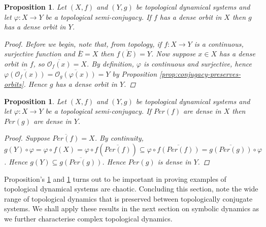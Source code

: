 \documentclass[11pt,a4paper,oneside]{memoir}
\theoremstyle{plain}
\newtheorem{prop}[thm]{Proposition}
\theoremstyle{definition}
\begin{document}
\begin{prop} \label{prop:conjugacy-preserves-dense-orbits}
    Let $(X, f)$ and $(Y, g)$ be topological dynamical systems and let $\varphi: X \to Y$ be a topological semi-conjugacy. If $f$ has a dense orbit in $X$ then $g$ has a dense orbit in $Y$.
    \begin{proof}
        Before we begin, note that, from topology, if $f: X \to Y$ is a continuous, surjective function and $\overline{E} = X$ then $\overline{f(E)} = Y$. Now suppose $x \in X$ has a dense orbit in $f$, so $\overline{\mathcal{O}_f(x)} = X$. By definition, $\varphi$ is continuous and surjective, hence $\overline{\varphi(\mathcal{O}_{f}(x))} = \overline{\mathcal{O}_{g}(\varphi(x))} = Y$ by Proposition \ref{prop:conjugacy-preserves-orbits}. Hence $g$ has a dense orbit in $Y$.
    \end{proof}
\end{prop}

\begin{prop} \label{prop:conjugacy-preserves-dense-periodic-points}
    Let $(X, f)$ and $(Y,g)$ be topological dynamical systems and let $\varphi: X \to Y$ be a topological semi-conjugacy. If $Per(f)$ are dense in $X$ then $Per(g)$ are dense in $Y$.
    \begin{proof}
        Suppose $\overline{Per(f)} = X$. By continuity, $g(Y) \circ \varphi = \varphi \circ f(X) = \varphi \circ f(\overline{Per(f)}) \subseteq \varphi \circ \overline{f(Per(f))} = \overline{g(Per(g))} \circ \varphi$. Hence $g(Y) \subseteq \overline{g(Per(g))}$. Hence $Per(g)$ is dense in $Y$.
    \end{proof}
\end{prop}

Proposition's \ref{prop:conjugacy-preserves-dense-orbits} and \ref{prop:conjugacy-preserves-dense-periodic-points} turns out to be important in proving examples of topological dynamical systems are chaotic. Concluding this section, note the wide range of topological dynamics that is preserved between topologically conjugate systems. We shall apply these results in the next section on symbolic dynamics as we further characterise complex topological dynamics.
\end{document}
